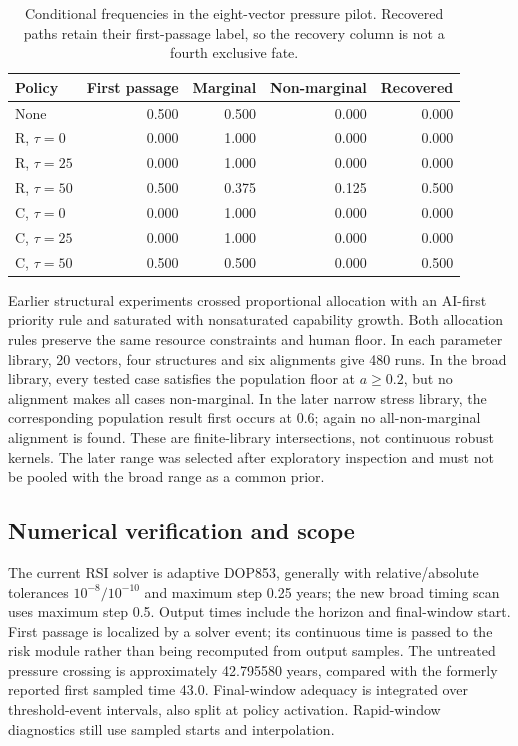 \documentclass[12pt,a4paper]{article}
\theoremstyle{remark}
\begin{document}
\begin{table}[htbp]\centering\small
\caption{Conditional frequencies in the eight-vector pressure pilot. Recovered paths retain their first-passage label, so the recovery column is not a fourth exclusive fate.}\label{tab:pilotprob}
\begin{tabular}{@{}lrrrr@{}}\toprule
Policy & First passage & Marginal & Non-marginal & Recovered\\\midrule
None & 0.500 & 0.500 & 0.000 & 0.000\\
R, $\tau=0$ & 0.000 & 1.000 & 0.000 & 0.000\\
R, $\tau=25$ & 0.000 & 1.000 & 0.000 & 0.000\\
R, $\tau=50$ & 0.500 & 0.375 & 0.125 & 0.500\\
C, $\tau=0$ & 0.000 & 1.000 & 0.000 & 0.000\\
C, $\tau=25$ & 0.000 & 1.000 & 0.000 & 0.000\\
C, $\tau=50$ & 0.500 & 0.500 & 0.000 & 0.500\\
\bottomrule\end{tabular}
\end{table}

Earlier structural experiments crossed proportional allocation with an AI-first priority rule and saturated with nonsaturated capability growth. Both allocation rules preserve the same resource constraints and human floor. In each parameter library, 20 vectors, four structures and six alignments give 480 runs. In the broad library, every tested case satisfies the population floor at $a\ge0.2$, but no alignment makes all cases non-marginal. In the later narrow stress library, the corresponding population result first occurs at 0.6; again no all-non-marginal alignment is found. These are finite-library intersections, not continuous robust kernels. The later range was selected after exploratory inspection and must not be pooled with the broad range as a common prior.

\subsection{Numerical verification and scope}\label{sec:verification}
The current RSI solver is adaptive DOP853, generally with relative/absolute tolerances $10^{-8}/10^{-10}$ and maximum step 0.25 years; the new broad timing scan uses maximum step 0.5. Output times include the horizon and final-window start. First passage is localized by a solver event; its continuous time is passed to the risk module rather than being recomputed from output samples. The untreated pressure crossing is approximately 42.795580 years, compared with the formerly reported first sampled time 43.0. Final-window adequacy is integrated over threshold-event intervals, also split at policy activation. Rapid-window diagnostics still use sampled starts and interpolation.
\end{document}
